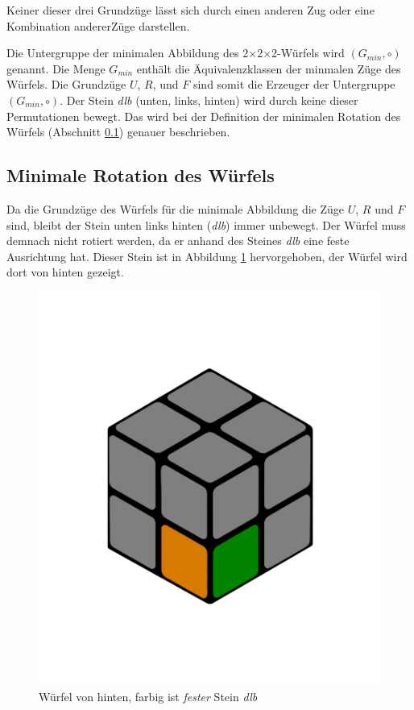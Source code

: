 \documentclass[12pt,a4paper, usenames, dvipsnames]{article}
\theoremstyle{mystyle}
\theoremstyle{definition}
\newcommand{\Ttwo}{2$\times$2$\times$2-}
\begin{document}
Keiner dieser drei Grundzüge lässt sich durch einen anderen Zug oder eine Kombination andererZüge darstellen.

Die Untergruppe der minimalen Abbildung des \Ttwo Würfels wird $(G_{min}, \circ)$ genannt. Die Menge $G_{min}$ enthält die Äquivalenzklassen der minmalen Züge des Würfels.
Die Grundzüge $U$, $R$, und $F$ sind somit die Erzeuger der Untergruppe $(G_{min}, \circ)$.
Der Stein \textit{dlb} (unten, links, hinten) wird durch keine dieser Permutationen bewegt. Das wird bei der Definition der minimalen Rotation des Würfels (Abschnitt \ref{Abschnitt_minimaleRotation}) genauer beschrieben.


%
%
%
%
%
%
%
%
%
%
%
%
%
%
%
%
%
%
\subsection{Minimale Rotation des Würfels}

\label{Abschnitt_minimaleRotation}

Da die Grundzüge des Würfels für die minimale Abbildung die Züge $U$, $R$ und $F$ sind, bleibt der Stein unten links hinten (\textit{dlb}) immer unbewegt. Der Würfel muss demnach nicht rotiert werden, da er anhand des Steines \textit{dlb} eine feste Ausrichtung hat. Dieser Stein ist in Abbildung \ref{Abbildung_DLB} hervorgehoben, der Würfel wird dort von hinten gezeigt. 

\begin{figure}[H]
\centering
\includegraphics[scale=0.15]{DLB.png}
\caption{Würfel von hinten, farbig ist \textit{fester} Stein \textit{dlb}}
\label{Abbildung_DLB}
\end{figure}
\end{document}

